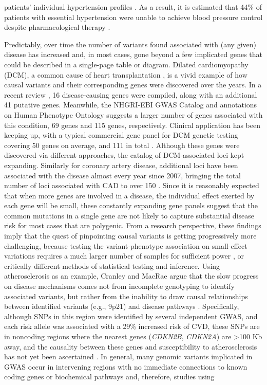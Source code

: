 \documentclass[letter]{bib}
\newcounter{example}[subsection]
\begin{document}
patients' individual hypertension profiles \citep{Johnson:2017:Enabling}.  As a result, it is estimated that 44\% of patients with essential hypertension were unable to achieve blood pressure control despite pharmacological therapy \citep{Johnson:2017:Enabling, Moran:2015:Cost}. 

Predictably, over time the number of variants found associated with (any given) disease has increased and, in most cases, gone beyond a few implicated genes that could be described in a single-page table or diagram.  Dilated cardiomyopathy (DCM), a common cause of heart transplantation \citep{Burke:2016:Clinical}, is a vivid example of how causal variants and their corresponding genes were discovered over the years.  In a recent review \citep{Burke:2016:Clinical}, 16 disease-causing genes were compiled, along with an additional 41 putative genes.  Meanwhile, the NHGRI-EBI GWAS Catalog \citep{MacArthur:2017:new} and annotations on Human Phenotype Ontology \citep{Kohler:2017:Human} suggests a larger number of genes associated with this condition, 69 genes and 115 genes, respectively. Clinical application has been keeping up, with a typical commercial gene panel for DCM genetic testing covering 50 genes on average, and 111 in total \citep{McNally:2017:Dilated}. Although these genes were discovered via different approaches, the catalog of DCM-associated loci kept expanding. Similarly for coronary artery disease, additional loci have been associated with the disease almost every year since 2007, bringing the total number of loci associated with CAD to over 150 \citep{Clarke:2018:GenomeWide}.  Since it is reasonably expected that when more genes are involved in a disease, the individual effect exerted by each gene will be small, these constantly expanding gene panels suggest that the common mutations in a single gene are not likely to capture substantial disease risk for most cases that are polygenic. From a research perspective, these findings imply that the quest of pinpointing causal variants is getting progressively more challenging, because testing the variant-phenotype association on small-effect variations requires a much larger number of samples for sufficient power \citep{Visscher:2017:10}, or critically different methods of statistical testing and inference.  Using atherosclerosis as an example, Cranley and MacRae \citep{Cranley:2018:New} argue that the slow progress on disease mechanisms comes not from incomplete genotyping to identify associated variants, but rather from the inability to draw causal relationships between identified variants (e.g., 9p21) and disease pathways \citep{Lau:2018:Omics}.  Specifically, although SNPs in this region were identified by several independent GWAS, and each risk allele was associated with a 29\% increased risk of CVD, these SNPs are in noncoding regions where the nearest genes (\emph{CDKN2B}, \emph{CDKN2A}) are >100 Kb away, and the causality between these genes and susceptibility to atherosclerosis has not yet been ascertained \citep{Helgadottir:2007:Common,McPherson:2007:Common,Samani:2007:Genomewide}.  In general, many genomic variants implicated in GWAS occur in intervening regions with no immediate connections to known coding genes or biochemical pathways and, therefore, studies using 
\end{document}

